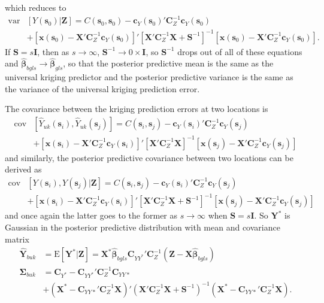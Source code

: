 \documentclass[12pt]{article}
\begin{document}
which reduces to
\begin{align*}
\mathrm{var}&\left[Y(\bm{s}_0)|\bm{Z}\right] =C(\bm{s}_0, \bm{s}_0) - \bm{c}_Y(\bm{s}_0)'\bm{C}_Z^{-1}\bm{c}_Y(\bm{s}_0) \\
&+ [\bm{x}(\bm{s}_0) - \bm{X}'\bm{C}_Z^{-1}\bm{c}_Y(\bm{s}_0)]'[\bm{X}'\bm{C}_Z^{-1}\bm{X} + \bm{S}^{-1}]^{-1}[\bm{x}(\bm{s}_0) - \bm{X}'\bm{C}_Z^{-1}\bm{c}_Y(\bm{s}_0)].
\end{align*}
If $\bm{S}=s\bm{I}$, then as $s\to\infty$, $\bm{S}^{-1}\to 0\times \bm{I}$, so $\bm{S}^{-1}$ drops out of all of these equations and $\widehat{\bm{\beta}}_{bgls}\to\widehat{\bm{\beta}}_{gls}$, so that the posterior predictive mean is the same as the universal kriging predictor and the posterior predictive variance is the same as the variance of the universal kriging prediction error.

The covariance between the kriging prediction errors at two locations is
\begin{align*}
\mathrm{cov}&[\widehat{Y}_{uk}(\bm{s}_i),\widehat{Y}_{uk}(\bm{s}_j)] = C(\bm{s}_i,\bm{s}_j) - \bm{c}_Y(\bm{s}_i)'\bm{C}_Z^{-1}\bm{c}_Y(\bm{s}_j)\\
&+ [\bm{x}(\bm{s}_i) - \bm{X}'\bm{C}_Z^{-1}\bm{c}_Y(\bm{s}_i)]'[\bm{X}'\bm{C}_Z^{-1}\bm{X}]^{-1}[\bm{x}(\bm{s}_j) - \bm{X}'\bm{C}_Z^{-1}\bm{c}_Y(\bm{s}_j)]
\end{align*}
and similarly, the posterior predictive covariance between two locations can be derived as
\begin{align*}
\mathrm{cov}&[Y(\bm{s}_i),Y(\bm{s}_j)|\bm{Z}] = C(\bm{s}_i,\bm{s}_j) - \bm{c}_Y(\bm{s}_i)'\bm{C}_Z^{-1}\bm{c}_Y(\bm{s}_j)\\
&+ [\bm{x}(\bm{s}_i) - \bm{X}'\bm{C}_Z^{-1}\bm{c}_Y(\bm{s}_i)]'[\bm{X}'\bm{C}_Z^{-1}\bm{X} + \bm{S}^{-1}]^{-1}[\bm{x}(\bm{s}_j) - \bm{X}'\bm{C}_Z^{-1}\bm{c}_Y(\bm{s}_j)]
\end{align*}
and once again the latter goes to the former as $s\to\infty$ when $\bm{S}=s\bm{I}$. So $\bm{Y}^*$ is Gaussian in the posterior predictive distribution with mean and covariance matrix
\begin{align*}
\widehat{\bm{Y}}_{buk} &= \mathrm{E}[\bm{Y}^*|\bm{Z}] = \bm{X}^{*}\widehat{\bm{\beta}}_{bgls}\bm{C}_{YY^*}'\bm{C}_Z^{-1}(\bm{Z} - \bm{X}\widehat{\bm{\beta}}_{bgls})\\
\bm{\Sigma}_{buk} &= \bm{C}_{Y^*} - \bm{C}_{YY^*}'\bm{C}_Z^{-1}\bm{C}_{YY*}\\
&+ (\bm{X}^* - \bm{C}_{YY*}'\bm{C}_Z^{-1}\bm{X})'(\bm{X}'\bm{C}_Z^{-1}\bm{X} + \bm{S}^{-1})^{-1}(\bm{X}^* - \bm{C}_{YY*}'\bm{C}_Z^{-1}\bm{X}).
\end{align*}
\end{document}
